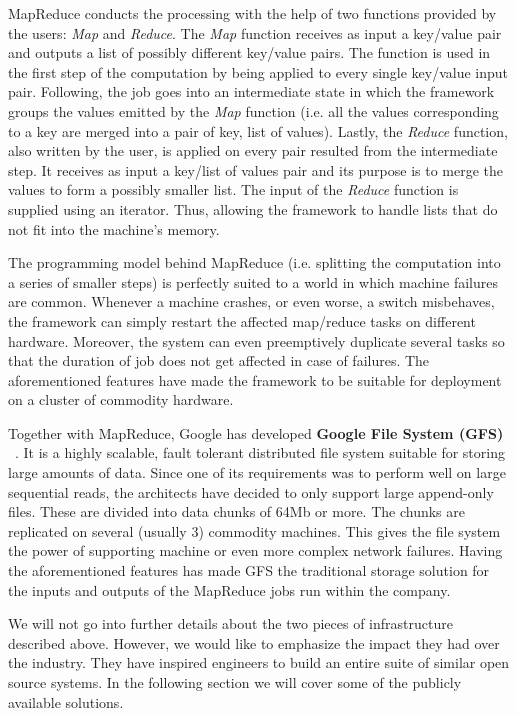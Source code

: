 \documentclass[11pt,a4paper,twoside]{report}
\begin{document}
MapReduce conducts the processing with the help of two functions provided by the users: \textit{Map} and \textit{Reduce}. The \textit{Map} function receives as input a key/value pair and outputs a list of possibly different key/value pairs. The function is used in the first step of the computation by being applied to every single key/value input pair. Following, the job goes into an intermediate state in which the framework groups the values emitted by the \textit{Map} function (i.e. all the values corresponding to a key are merged into a pair of key, list of values). Lastly, the \textit{Reduce} function, also written by the user, is applied on every pair resulted from the intermediate step. It receives as input a key/list of values pair and its purpose is to merge the values to form a possibly smaller list. The input of the \textit{Reduce} function is supplied using an iterator. Thus, allowing the framework to handle lists that do not fit into the machine's memory.


The programming model behind MapReduce (i.e. splitting the computation into a series of smaller steps) is perfectly suited to a world in which machine failures are common. Whenever a machine crashes, or even worse, a switch misbehaves, the framework can simply restart the affected map/reduce tasks on different hardware. Moreover, the system can even preemptively duplicate several tasks so that the duration of job does not get affected in case of failures. The aforementioned features have made the framework to be suitable for deployment on a cluster of commodity hardware.


Together with MapReduce, Google has developed \textbf{Google File System (GFS)} ~\cite{GFS}. It is a highly scalable, fault tolerant distributed file system suitable for storing large amounts of data. Since one of its requirements was to perform well on large sequential reads, the architects have decided to only support large append-only files. These are divided into data chunks of 64Mb or more. The chunks are replicated on several (usually 3) commodity machines. This gives the file system the power of supporting machine or even more complex network failures. Having the aforementioned features has made GFS the traditional storage solution for the inputs and outputs of the MapReduce jobs run within the company.


We will not go into further details about the two pieces of infrastructure described above. However, we would like to emphasize the impact they had over the industry. They have inspired engineers to build an entire suite of similar open source systems. In the following section we will cover some of the publicly available solutions.
\end{document}
